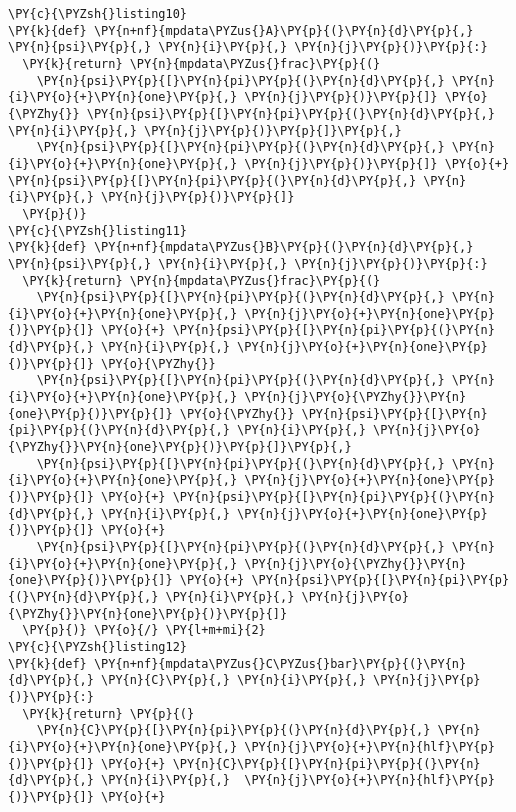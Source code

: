 \begin{Verbatim}[commandchars=\\\{\}]
\PY{c}{\PYZsh{}listing10}
\PY{k}{def} \PY{n+nf}{mpdata\PYZus{}A}\PY{p}{(}\PY{n}{d}\PY{p}{,} \PY{n}{psi}\PY{p}{,} \PY{n}{i}\PY{p}{,} \PY{n}{j}\PY{p}{)}\PY{p}{:}
  \PY{k}{return} \PY{n}{mpdata\PYZus{}frac}\PY{p}{(}
    \PY{n}{psi}\PY{p}{[}\PY{n}{pi}\PY{p}{(}\PY{n}{d}\PY{p}{,} \PY{n}{i}\PY{o}{+}\PY{n}{one}\PY{p}{,} \PY{n}{j}\PY{p}{)}\PY{p}{]} \PY{o}{\PYZhy{}} \PY{n}{psi}\PY{p}{[}\PY{n}{pi}\PY{p}{(}\PY{n}{d}\PY{p}{,} \PY{n}{i}\PY{p}{,} \PY{n}{j}\PY{p}{)}\PY{p}{]}\PY{p}{,}
    \PY{n}{psi}\PY{p}{[}\PY{n}{pi}\PY{p}{(}\PY{n}{d}\PY{p}{,} \PY{n}{i}\PY{o}{+}\PY{n}{one}\PY{p}{,} \PY{n}{j}\PY{p}{)}\PY{p}{]} \PY{o}{+} \PY{n}{psi}\PY{p}{[}\PY{n}{pi}\PY{p}{(}\PY{n}{d}\PY{p}{,} \PY{n}{i}\PY{p}{,} \PY{n}{j}\PY{p}{)}\PY{p}{]}
  \PY{p}{)}
\PY{c}{\PYZsh{}listing11}
\PY{k}{def} \PY{n+nf}{mpdata\PYZus{}B}\PY{p}{(}\PY{n}{d}\PY{p}{,} \PY{n}{psi}\PY{p}{,} \PY{n}{i}\PY{p}{,} \PY{n}{j}\PY{p}{)}\PY{p}{:}
  \PY{k}{return} \PY{n}{mpdata\PYZus{}frac}\PY{p}{(} 
    \PY{n}{psi}\PY{p}{[}\PY{n}{pi}\PY{p}{(}\PY{n}{d}\PY{p}{,} \PY{n}{i}\PY{o}{+}\PY{n}{one}\PY{p}{,} \PY{n}{j}\PY{o}{+}\PY{n}{one}\PY{p}{)}\PY{p}{]} \PY{o}{+} \PY{n}{psi}\PY{p}{[}\PY{n}{pi}\PY{p}{(}\PY{n}{d}\PY{p}{,} \PY{n}{i}\PY{p}{,} \PY{n}{j}\PY{o}{+}\PY{n}{one}\PY{p}{)}\PY{p}{]} \PY{o}{\PYZhy{}}
    \PY{n}{psi}\PY{p}{[}\PY{n}{pi}\PY{p}{(}\PY{n}{d}\PY{p}{,} \PY{n}{i}\PY{o}{+}\PY{n}{one}\PY{p}{,} \PY{n}{j}\PY{o}{\PYZhy{}}\PY{n}{one}\PY{p}{)}\PY{p}{]} \PY{o}{\PYZhy{}} \PY{n}{psi}\PY{p}{[}\PY{n}{pi}\PY{p}{(}\PY{n}{d}\PY{p}{,} \PY{n}{i}\PY{p}{,} \PY{n}{j}\PY{o}{\PYZhy{}}\PY{n}{one}\PY{p}{)}\PY{p}{]}\PY{p}{,}
    \PY{n}{psi}\PY{p}{[}\PY{n}{pi}\PY{p}{(}\PY{n}{d}\PY{p}{,} \PY{n}{i}\PY{o}{+}\PY{n}{one}\PY{p}{,} \PY{n}{j}\PY{o}{+}\PY{n}{one}\PY{p}{)}\PY{p}{]} \PY{o}{+} \PY{n}{psi}\PY{p}{[}\PY{n}{pi}\PY{p}{(}\PY{n}{d}\PY{p}{,} \PY{n}{i}\PY{p}{,} \PY{n}{j}\PY{o}{+}\PY{n}{one}\PY{p}{)}\PY{p}{]} \PY{o}{+}
    \PY{n}{psi}\PY{p}{[}\PY{n}{pi}\PY{p}{(}\PY{n}{d}\PY{p}{,} \PY{n}{i}\PY{o}{+}\PY{n}{one}\PY{p}{,} \PY{n}{j}\PY{o}{\PYZhy{}}\PY{n}{one}\PY{p}{)}\PY{p}{]} \PY{o}{+} \PY{n}{psi}\PY{p}{[}\PY{n}{pi}\PY{p}{(}\PY{n}{d}\PY{p}{,} \PY{n}{i}\PY{p}{,} \PY{n}{j}\PY{o}{\PYZhy{}}\PY{n}{one}\PY{p}{)}\PY{p}{]}
  \PY{p}{)} \PY{o}{/} \PY{l+m+mi}{2}
\PY{c}{\PYZsh{}listing12}
\PY{k}{def} \PY{n+nf}{mpdata\PYZus{}C\PYZus{}bar}\PY{p}{(}\PY{n}{d}\PY{p}{,} \PY{n}{C}\PY{p}{,} \PY{n}{i}\PY{p}{,} \PY{n}{j}\PY{p}{)}\PY{p}{:}
  \PY{k}{return} \PY{p}{(}
    \PY{n}{C}\PY{p}{[}\PY{n}{pi}\PY{p}{(}\PY{n}{d}\PY{p}{,} \PY{n}{i}\PY{o}{+}\PY{n}{one}\PY{p}{,} \PY{n}{j}\PY{o}{+}\PY{n}{hlf}\PY{p}{)}\PY{p}{]} \PY{o}{+} \PY{n}{C}\PY{p}{[}\PY{n}{pi}\PY{p}{(}\PY{n}{d}\PY{p}{,} \PY{n}{i}\PY{p}{,}  \PY{n}{j}\PY{o}{+}\PY{n}{hlf}\PY{p}{)}\PY{p}{]} \PY{o}{+}

\end{Verbatim}
